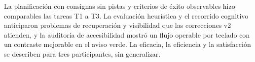 La planificación con consignas sin pistas y criterios de éxito observables hizo comparables las tareas T1 a T3. La evaluación heurística y el recorrido cognitivo anticiparon problemas de recuperación y visibilidad que las correcciones v2 atienden, y la auditoría de accesibilidad mostró un flujo operable por teclado con un contraste mejorable en el aviso verde. La eficacia, la eficiencia y la satisfacción se describen para tres participantes, sin generalizar.
